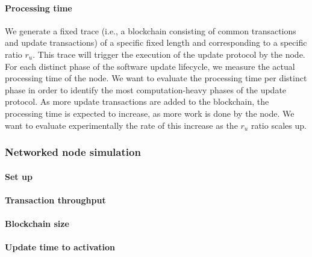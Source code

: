 \paragraph{Processing time}
We generate a fixed trace (i.e., a blockchain consisting of common transactions
and update transactions) of a specific fixed length and corresponding to a
specific ratio $r_u$. This trace will trigger the execution of the update
protocol by the node. For each distinct phase of the software update lifecycle,
we measure the actual processing time of the node. We want to evaluate the
processing time per distinct phase in order to identify the most
computation-heavy phases of the update protocol. As more update transactions are
added to the blockchain, the processing time is expected to increase, as more
work is done by the node. We want to evaluate experimentally the rate of this
increase as the $r_u$ ratio scales up.

\subsubsection{Networked node simulation}
\paragraph{Set up}
\paragraph{Transaction throughput}
\paragraph{Blockchain size}
\paragraph{Update time to activation}
